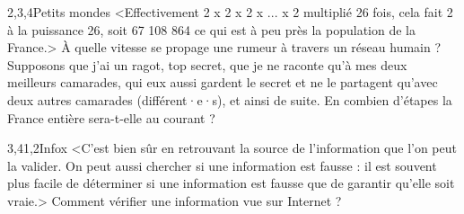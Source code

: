 \begin{quiz}[title={Réseaux sociaux}]
\vspace{-\baselineskip}

\begin{quizquestion*}[b]{1}{2,3,4}{Petits mondes}
<Effectivement 2 x 2 x 2 x ... x 2 multiplié 26 fois, cela fait 2 à la puissance 26, soit 67 108 864 ce qui est à peu près la population de la France.>
À quelle vitesse se propage une rumeur à travers un réseau humain ?
Supposons que j’ai un ragot, top secret, que je ne raconte qu’à mes deux meilleurs camarades, qui eux aussi gardent le secret et ne le partagent qu’avec deux autres camarades (différent·e·s), et ainsi de suite.
En combien d’étapes la France entière sera-t-elle au courant ?
\end{quizquestion*}

\begin{quizquestion}[b]{3,4}{1,2}{Infox}
<C'est bien sûr en retrouvant la source de l'information que l'on peut la valider.
On peut aussi chercher si une information est fausse : il est souvent plus facile de déterminer si une information est fausse que de garantir qu'elle soit vraie.>
Comment vérifier une information vue sur Internet ?
\end{quizquestion}


\end{quiz}

